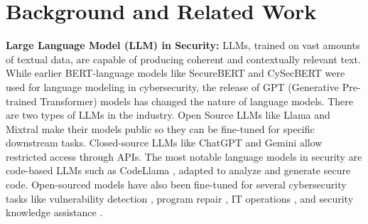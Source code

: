 \documentclass[conference]{IEEEtran}
\begin{document}


\section{Background and Related Work}\label{sec:related}

\textbf{Large Language Model (LLM) in Security:} LLMs, trained on vast amounts of textual data, are capable of producing coherent and contextually relevant text. While earlier BERT-language models like SecureBERT \cite{aghaei2022securebert} and CySecBERT \cite{bayer2024cysecbert} were used for language modeling in cybersecurity, the release of GPT (Generative Pre-trained Transformer) models has changed the nature of language models. There are two types of LLMs in the industry. Open Source LLMs like Llama \cite{llama370b} and Mixtral \cite{jiang2023mistral} make their models public so they can be fine-tuned for specific downstream tasks. Closed-source LLMs like ChatGPT \cite{gpt4} and Gemini \cite{team2024gemma} allow restricted access through APIs. The most notable language models in security are code-based LLMs such as  CodeLlama \cite{roziere2023code}, adapted to analyze and generate secure code. Open-sourced models have also been fine-tuned for several cybersecurity tasks like vulnerability detection \cite{shestov2024finetuning, ferrag2023securefalcon, fang2024llm, li2024llm}, program repair \cite{silva2023repairllama}, IT operations \cite{guo2023owl}, and security knowledge assistance \cite{sultana2023towards}.
\end{document}
